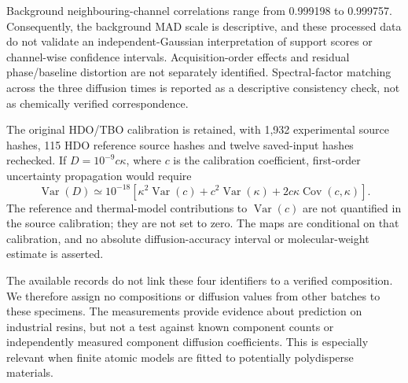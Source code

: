 Background neighbouring-channel correlations range from 0.999198 to 0.999757. Consequently, the background MAD scale is descriptive, and these processed data do not validate an independent-Gaussian interpretation of support scores or channel-wise confidence intervals. Acquisition-order effects and residual phase/baseline distortion are not separately identified. Spectral-factor matching across the three diffusion times is reported as a descriptive consistency check, not as chemically verified correspondence.

The original HDO/TBO calibration is retained, with 1,932 experimental source hashes, 115 HDO reference source hashes and twelve saved-input hashes rechecked. If $D=10^{-9}c\kappa$, where $c$ is the calibration coefficient, first-order uncertainty propagation would require
\begin{equation}
 \operatorname{Var}(D)\simeq 10^{-18}\left[\kappa^2\operatorname{Var}(c)+c^2\operatorname{Var}(\kappa)+2c\kappa\operatorname{Cov}(c,\kappa)\right].
\end{equation}
The reference and thermal-model contributions to $\operatorname{Var}(c)$ are not quantified in the source calibration; they are not set to zero. The maps are conditional on that calibration, and no absolute diffusion-accuracy interval or molecular-weight estimate is asserted.

The available records do not link these four identifiers to a verified composition.
We therefore assign no compositions or diffusion values from other batches to
these specimens. The measurements provide evidence about prediction on industrial
resins, but not a test against known component counts or independently measured
component diffusion coefficients. This is especially relevant when finite atomic
models are fitted to potentially polydisperse materials.

